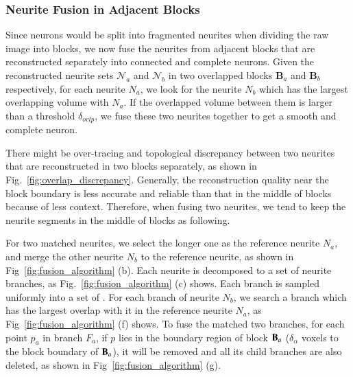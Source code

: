 \subsubsection{Neurite Fusion in Adjacent Blocks}
\label{sec:fusion}

Since neurons would be split into fragmented neurites when dividing the raw image into blocks, we now fuse the neurites from adjacent blocks that are reconstructed separately into connected and complete neurons.
Given the reconstructed neurite sets $\mathcal{N}_a$ and $\mathcal{N}_b$ in two overlapped blocks $\mathbf{B}_a$ and $\mathbf{B}_b$ respectively, for each neurite ${N}_{a}$, we look for the neurite ${N}_{b}$ which has the largest overlapping volume with ${N}_{a}$. If the overlapped volume between them is larger than a threshold $\delta_{ovlp}$, we fuse these two neurites together to get a smooth and complete neuron.

There might be over-tracing and topological discrepancy between two neurites that are reconstructed in two blocks separately, as shown in Fig.~\ref{fig:overlap_discrepancy}.
Generally, the reconstruction quality near the block boundary is less accurate and reliable than that in the middle of blocks because of less context. 
Therefore, when fusing two neurites, we tend to keep the neurite segments in the middle of blocks as following. 
  
For two matched neurites, we select the longer one as the reference neurite $N_a$, and merge the other neurite $N_b$ to the reference neurite, as shown in Fig~\ref{fig:fusion_algorithm} (b).
%
Each neurite is decomposed to a set of neurite branches, as Fig.~\ref{fig:fusion_algorithm} (c) shows.
Each branch is sampled uniformly into a set of .
%
For each branch of neurite $N_b$, we search a branch which has the largest overlap with it in the reference neurite $N_a$, as Fig~\ref{fig:fusion_algorithm} (f) shows.
To fuse the matched two branches, for each point $p_a$ in branch $F_a$, if $p$ lies in the boundary region of block $\mathbf{B}_a$ ($\delta_{\alpha}$ voxels to the block boundary of $\mathbf{B}_a$), it will be removed and all its child branches are also deleted, as shown in Fig~\ref{fig:fusion_algorithm} (g). 


